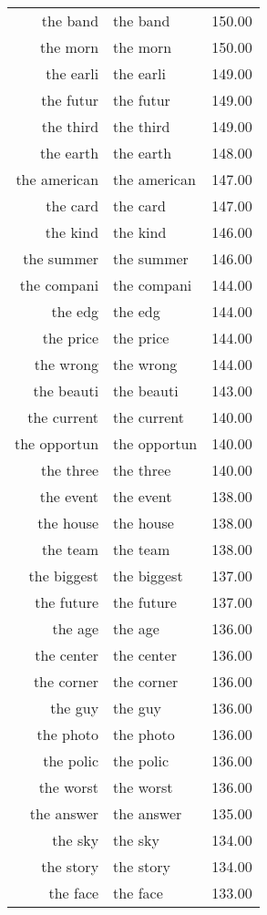 \begin{table}[ht]
\begin{tabular}{rlr}
  the band & the band & 150.00 \\ 
  the morn & the morn & 150.00 \\ 
  the earli & the earli & 149.00 \\ 
  the futur & the futur & 149.00 \\ 
  the third & the third & 149.00 \\ 
  the earth & the earth & 148.00 \\ 
  the american & the american & 147.00 \\ 
  the card & the card & 147.00 \\ 
  the kind & the kind & 146.00 \\ 
  the summer & the summer & 146.00 \\ 
  the compani & the compani & 144.00 \\ 
  the edg & the edg & 144.00 \\ 
  the price & the price & 144.00 \\ 
  the wrong & the wrong & 144.00 \\ 
  the beauti & the beauti & 143.00 \\ 
  the current & the current & 140.00 \\ 
  the opportun & the opportun & 140.00 \\ 
  the three & the three & 140.00 \\ 
  the event & the event & 138.00 \\ 
  the house & the house & 138.00 \\ 
  the team & the team & 138.00 \\ 
  the biggest & the biggest & 137.00 \\ 
  the future & the future & 137.00 \\ 
  the age & the age & 136.00 \\ 
  the center & the center & 136.00 \\ 
  the corner & the corner & 136.00 \\ 
  the guy & the guy & 136.00 \\ 
  the photo & the photo & 136.00 \\ 
  the polic & the polic & 136.00 \\ 
  the worst & the worst & 136.00 \\ 
  the answer & the answer & 135.00 \\ 
  the sky & the sky & 134.00 \\ 
  the story & the story & 134.00 \\ 
  the face & the face & 133.00 \\ 

\end{tabular}
\end{table}
